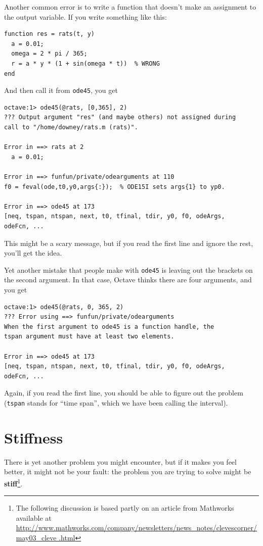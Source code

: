\documentclass{book}
\begin{document}
Another common error is to write a function that doesn't make
an assignment to the output variable. If you write something
like this:

\begin{verbatim}
function res = rats(t, y)
  a = 0.01;
  omega = 2 * pi / 365;
  r = a * y * (1 + sin(omega * t))  % WRONG
end
\end{verbatim}

And then call it from {\tt ode45}, you get

\begin{verbatim}
octave:1> ode45(@rats, [0,365], 2)
??? Output argument "res" (and maybe others) not assigned during 
call to "/home/downey/rats.m (rats)".

Error in ==> rats at 2
  a = 0.01;

Error in ==> funfun/private/odearguments at 110
f0 = feval(ode,t0,y0,args{:});  % ODE15I sets args{1} to yp0.

Error in ==> ode45 at 173
[neq, tspan, ntspan, next, t0, tfinal, tdir, y0, f0, odeArgs, 
odeFcn, ...
\end{verbatim}

This might be a scary message, but if you read the first line
and ignore the rest, you'll get the idea.

Yet another mistake that people make with {\tt ode45} is leaving
out the brackets on the second argument. In that case, Octave
thinks there are four arguments, and you get

\begin{verbatim}
octave:1> ode45(@rats, 0, 365, 2)
??? Error using ==> funfun/private/odearguments
When the first argument to ode45 is a function handle, the 
tspan argument must have at least two elements.

Error in ==> ode45 at 173
[neq, tspan, ntspan, next, t0, tfinal, tdir, y0, f0, odeArgs, 
odeFcn, ...
\end{verbatim}

Again, if you read the first line, you should be able to figure
out the problem ({\tt tspan} stands for ``time span'', which we
have been calling the interval).


\section{Stiffness}

There is yet another problem you might encounter, but if it makes you
feel better, it might not be your fault: the problem you are trying to
solve might be {\bf stiff}\footnote{The following discussion is based
partly on an article from Mathworks available at
\url{
http://www.mathworks.com/company/newsletters/news_notes/clevescorner/may03_cleve
.html}}.
\end{document}
